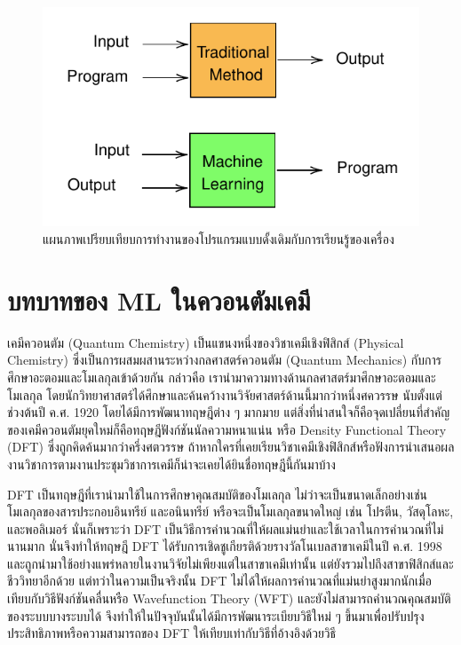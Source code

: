\begin{figure}[H]
    \centering
    \includegraphics[scale=1]{fig/ML-concept.pdf}
    \caption{แผนภาพเปรียบเทียบการทำงานของโปรแกรมแบบดั้งเดิมกับการเรียนรู้ของเครื่อง}
    \label{fig:ml_paradigm}
\end{figure}

\section{บทบาทของ ML ในควอนตัมเคมี}

เคมีควอนตัม (Quantum Chemistry) เป็นแขนงหนึ่งของวิชาเคมีเชิงฟิสิกส์ (Physical Chemistry) ซึ่งเป็นการผสมผสานระหว่างกลศาสตร์ควอนตัม 
(Quantum Mechanics) กับการศึกษาอะตอมและโมเลกุลเข้าด้วยกัน กล่าวคือ เรานำมาความทางด้านกลศาสตร์มาศึกษาอะตอมและโมเลกุล
โดยนักวิทยาศาสตร์ได้ศึกษาและค้นคว้างานวิจัยศาสตร์ด้านนี้มากว่าหนึ่งศควรรษ นับตั้งแต่ช่วงต้นปี ค.ศ. 1920 โดยได้มีการพัฒนาทฤษฎีต่าง ๆ มากมาย 
แต่สิ่งที่น่าสนใจก็คือจุดเปลี่ยนที่สำคัญของเคมีควอนตัมยุคใหม่ก็คือทฤษฎีฟังก์ชันนัลความหนาแน่น หรือ Density Functional Theory (DFT) 
ซึ่งถูกคิดค้นมากว่าครึ่งศตวรรษ ถ้าหากใครที่เคยเรียนวิชาเคมีเชิงฟิสิกส์หรือฟังการนำเสนอผลงานวิชาการตามงานประชุมวิชาการเคมีก็น่าจะเคยได้ยินชื่อทฤษฎีนี้กันมาบ้าง 

DFT เป็นทฤษฎีที่เรานำมาใช้ในการศึกษาคุณสมบัติของโมเลกุล ไม่ว่าจะเป็นขนาดเล็กอย่างเช่นโมเลกุลของสารประกอบอินทรีย์ และอนินทรีย์ 
หรือจะเป็นโมเลกุลขนาดใหญ่ เช่น โปรตีน, วัสดุโลหะ, และพอลิเมอร์ นั่นก็เพราะว่า DFT เป็นวิธีการคำนวณที่ให้ผลแม่นยำและใช้เวลาในการคำนวณที่ไม่นานมาก
นั่นจึงทำให้ทฤษฎี DFT ได้รับการเชิดชูเกียรติด้วยรางวัลโนเบลสาขาเคมีในปี ค.ศ. 1998 และถูกนำมาใช้อย่างแพร่หลายในงานวิจัยไม่เพียงแต่ในสาขาเคมีเท่านั้น 
แต่ยังรวมไปถึงสาขาฟิสิกส์และชีววิทยาอีกด้วย แต่ทว่าในความเป็นจริงนั้น DFT ไม่ได้ให้ผลการคำนวณที่แม่นยำสูงมากนักเมื่อเทียบกับวิธีฟังก์ชันคลื่นหรือ
Wavefunction Theory (WFT) และยังไม่สามารถคำนวณคุณสมบัติของระบบบางระบบได้ จึงทำให้ในปัจจุบันนั้นได้มีการพัฒนาระเบียบวิธีใหม่ ๆ 
ขึ้นมาเพื่อปรับปรุงประสิทธิภาพหรือความสามารถของ DFT ให้เทียบเท่ากับวิธีที่อ้างอิงด้วยวิธี

